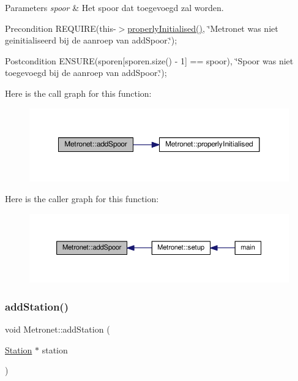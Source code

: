 \begin{DoxyParams}{Parameters}
{\em spoor} & Het spoor dat toegevoegd zal worden. \\
\hline
\end{DoxyParams}
\begin{DoxyPrecond}{Precondition}
R\+E\+Q\+U\+I\+RE(this-\/$>$\hyperlink{class_metronet_a3d2adce29a947f162924279b766de645}{properly\+Initialised()}, \char`\"{}\+Metronet was niet geinitialiseerd bij de aanroep van add\+Spoor.\char`\"{}); 
\end{DoxyPrecond}
\begin{DoxyPostcond}{Postcondition}
E\+N\+S\+U\+RE(sporen\mbox{[}sporen.\+size() -\/ 1\mbox{]} == spoor), \char`\"{}\+Spoor was niet toegevoegd bij de aanroep van add\+Spoor.\char`\"{}); 
\end{DoxyPostcond}
Here is the call graph for this function\+:\nopagebreak
\begin{figure}[H]
\begin{center}
\leavevmode
\includegraphics[width=350pt]{class_metronet_a0422381a8d7f32a915e0ad966af43627_cgraph}
\end{center}
\end{figure}
Here is the caller graph for this function\+:\nopagebreak
\begin{figure}[H]
\begin{center}
\leavevmode
\includegraphics[width=350pt]{class_metronet_a0422381a8d7f32a915e0ad966af43627_icgraph}
\end{center}
\end{figure}
\mbox{\label{class_metronet_ac7f4069e577cd4dddb1e166923df3ecb}} 
\subsubsection{\texorpdfstring{add\+Station()}{addStation()}}
{\footnotesize\ttfamily void Metronet\+::add\+Station (\begin{DoxyParamCaption}\item[{\hyperlink{class_station}{Station} $\ast$}]{station }\end{DoxyParamCaption})}



